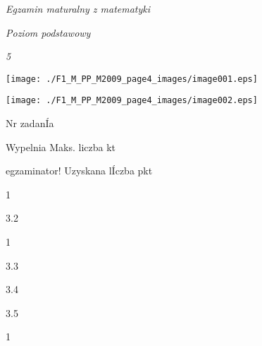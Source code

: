 \documentclass[a4paper,12pt]{article}
\begin{document}
{\it Egzamin maturalny z matematyki}

{\it Poziom podstawowy}

{\it 5}
\begin{center}
\texttt{[image: ./F1\_M\_PP\_M2009\_page4\_images/image001.eps]}

\texttt{[image: ./F1\_M\_PP\_M2009\_page4\_images/image002.eps]}
\end{center}
Nr zadanÍa

Wypelnia Maks. liczba kt

egzaminator! Uzyskana lÍczba pkt

1

3.2

1

3.3

3.4

3.5

1
\end{document}
